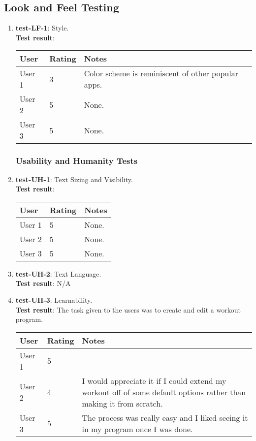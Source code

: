 \documentclass[12pt, titlepage]{article}
\begin{document}
\subsection{Look and Feel Testing}
\begin{enumerate}
	\item{\textbf{test-LF-1}}: Style.\\
	\textbf{Test result}: 
	
	\begin{center}
		\begin{tabular}{ | m{3cm} | m{3cm}| m{6cm} | } 
		  \hline
		  User & Rating & Notes \\ 
		  \hline
		  User 1 & 3 & Color scheme is reminiscent of other popular apps. \\ 
		  \hline
		  User 2 & 5 & None. \\ 
		  \hline
		  User 3 & 5 & None. \\ 
		  \hline
		\end{tabular}
	\end{center}

\subsubsection{Usability and Humanity Tests}
	\item{\textbf{test-UH-1}}: Text Sizing and Visibility.\\
	\textbf{Test result}:
	\begin{center}
		\begin{tabular}{ | m{3cm} | m{3cm}| m{6cm} | } 
		  \hline
		  User & Rating & Notes \\ 
		  \hline
		  User 1 & 5 & None.\\ 
		  \hline
		  User 2 & 5 & None.\\ 
		  \hline
		  User 3 & 5 & None. \\ 
		  \hline
		\end{tabular}
	\end{center}
	
	\item{\textbf{test-UH-2}}: Text Language.\\
	\textbf{Test result}:
	N/A
	
	\item{\textbf{test-UH-3}}: Learnability.\\
	\textbf{Test result}:
	The task given to the users was to create and edit a workout program.
	\begin{center}
		\begin{tabular}{ | m{3cm} | m{3cm}| m{6cm} | } 
		  \hline
		  User & Rating & Notes \\ 
		  \hline
		  User 1 & 5 & \\ 
		  \hline
		  User 2 & 4 & I would appreciate it if I could extend my workout off of some default options rather than making it from scratch. \\ 
		  \hline
		  User 3 & 5 & The process was really easy and I liked seeing it in my program once I was done. \\ 
		  \hline
		\end{tabular}
	\end{center}
	

\end{enumerate}
\end{document}
